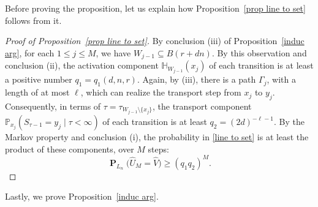 \documentclass[11pt,reqno]{amsart}
\theoremstyle{definition}
\numberwithin{equation}{section}
\renewcommand{\P}{\mathbb{P}}
\newcommand{\1}{\mathbf{1}}
\renewcommand{\H}{\mathbb{H}}
\DeclareMathOperator{\PP}{\mathbf{P}}
\newcommand{\wt}{\widehat}
\begin{document}
Before proving the proposition, let us explain how Proposition~\ref{prop line to set} follows from it. 

\begin{proof}[Proof of Proposition~\ref{prop line to set}]
By conclusion (iii) of Proposition~\ref{induc arg}, for each $1 \leq j \leq M$, we have $W_{j-1} \subseteq B(r + d n)$. By this observation and conclusion (ii), the activation component $\H_{W_{j-1}} (x_j)$ of each transition is at least a positive number $q_1 = q_1 (d,n,r)$. Again, by (iii), there is a path $\Gamma_j$, with a length of at most $\ell$, which can realize the transport step from $x_j$ to $y_j$. Consequently, in terms of $\tau = \tau_{W_{j-1} {\setminus} \{x_j\}}$, the transport component $\P_{x_j} ( S_{\tau - 1} = y_j \mid \tau < \infty)$ of each transition is at least $q_2 = (2d)^{-\ell-1}$. By the Markov property and conclusion (i), the probability in \eqref{line to set} is at least the product of these components, over $M$ steps:
\[
\PP_{L_n} \big( \wt{U}_M = \wt{V} \big) \geq (q_1 q_2)^M.
\]
\end{proof}

Lastly, we prove Proposition~\ref{induc arg}.
\end{document}
